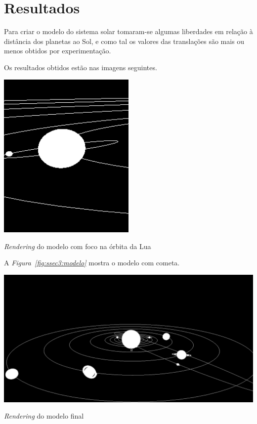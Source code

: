 \section{Resultados}


Para criar o modelo do sistema solar tomaram-se algumas liberdades em relação
à distância dos planetas ao Sol, e como tal os valores das translações são mais
ou menos obtidos por experimentação. 

Os resultados obtidos estão nas imagens seguintes.






\begin{center}
 	
 	\includegraphics[width=0.5\textwidth,height=0.5\textheight,keepaspectratio]{resources/orbita_lua.png}
 	\captionsetup{type=figure, width=0.8\linewidth}
	\caption{\textit{Rendering} do modelo com foco na órbita da Lua}
\label{fig:ssec3:tilt} 
\end{center}


A \emph{Figura~\ref{fig:ssec3:modelo}} mostra o modelo com cometa. 

\begin{center}
 	
 	\includegraphics[width=\textwidth,height=\textheight,keepaspectratio]{resources/cometa.png}
 	\captionsetup{type=figure, width=0.8\linewidth}
	\caption{\textit{Rendering} do modelo final}
\label{fig:ssec3:modelo} 
\end{center}

